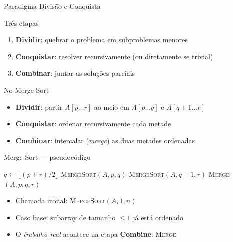 \documentclass[aspectratio=169]{beamer}
\begin{document}
\begin{frame}{Paradigma Divisão e Conquista}
  \begin{block}{Três etapas}
    \begin{enumerate}
      \item \textbf{Dividir}: quebrar o problema em subproblemas menores
      \item \textbf{Conquistar}: resolver recursivamente (ou diretamente se trivial)
      \item \textbf{Combinar}: juntar as soluções parciais
    \end{enumerate}
  \end{block}

  \vspace{6pt}
  \begin{exampleblock}{No Merge Sort}
    \begin{itemize}
      \item \textbf{Dividir}: partir $A[p \ldots r]$ ao meio em $A[p \ldots q]$ e $A[q{+}1 \ldots r]$
      \item \textbf{Conquistar}: ordenar recursivamente cada metade
      \item \textbf{Combinar}: intercalar (\emph{merge}) as duas metades ordenadas
    \end{itemize}
  \end{exampleblock}
\end{frame}

\begin{frame}[fragile]{Merge Sort — pseudocódigo}
  \begin{algorithm}[H]
    \caption{\textsc{MergeSort}$(A, p, r)$}
    \begin{algorithmic}[1]
        \State $q \gets \lfloor (p + r) / 2 \rfloor$
        \State \textsc{MergeSort}$(A, p, q)$
        \State \textsc{MergeSort}$(A, q{+}1, r)$
        \State \textsc{Merge}$(A, p, q, r)$
      \EndIf
    \end{algorithmic}
  \end{algorithm}

  \vspace{8pt}
  \begin{itemize}
    \item Chamada inicial: \textsc{MergeSort}$(A, 1, n)$
    \item Caso base: subarray de tamanho $\leq 1$ já está ordenado
    \item O \emph{trabalho real} acontece na etapa \textbf{Combine}: \textsc{Merge}
  \end{itemize}
\end{frame}
\end{document}
